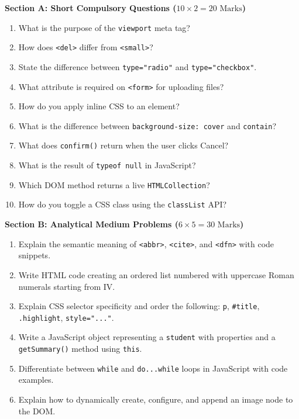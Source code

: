 \begin{mockexam}
\noindent\textbf{Section A: Short Compulsory Questions ($10 \times 2 = 20\text{ Marks}$)}
\begin{enumerate}[leftmargin=1.5em]
    \item What is the purpose of the \texttt{viewport} meta tag?
    \item How does \texttt{<del>} differ from \texttt{<small>}?
    \item State the difference between \texttt{type="radio"} and \texttt{type="checkbox"}.
    \item What attribute is required on \texttt{<form>} for uploading files?
    \item How do you apply inline CSS to an element?
    \item What is the difference between \texttt{background-size: cover} and \texttt{contain}?
    \item What does \texttt{confirm()} return when the user clicks Cancel?
    \item What is the result of \texttt{typeof null} in JavaScript?
    \item Which DOM method returns a live \texttt{HTMLCollection}?
    \item How do you toggle a CSS class using the \texttt{classList} API?
\end{enumerate}

\medskip
\noindent\textbf{Section B: Analytical Medium Problems ($6 \times 5 = 30\text{ Marks}$)}
\begin{enumerate}[leftmargin=1.5em, start=11]
    \item Explain the semantic meaning of \texttt{<abbr>}, \texttt{<cite>}, and \texttt{<dfn>} with code snippets.
    \item Write HTML code creating an ordered list numbered with uppercase Roman numerals starting from IV.
    \item Explain CSS selector specificity and order the following: \texttt{p}, \texttt{\#title}, \texttt{.highlight}, \texttt{style="..."}.
    \item Write a JavaScript object representing a \texttt{student} with properties and a \texttt{getSummary()} method using \texttt{this}.
    \item Differentiate between \texttt{while} and \texttt{do...while} loops in JavaScript with code examples.
    \item Explain how to dynamically create, configure, and append an image node to the DOM.
\end{enumerate}


\end{mockexam}

